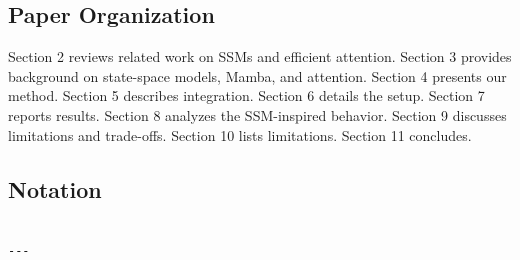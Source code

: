 \subsection{Paper Organization}

Section 2 reviews related work on SSMs and efficient attention. Section 3 
provides background on state-space models, Mamba, and attention. Section 4 
presents our method. Section 5 describes integration. Section 6 details the 
setup. Section 7 reports results. Section 8 analyzes the SSM-inspired 
behavior. Section 9 discusses limitations and trade-offs. Section 10 lists 
limitations. Section 11 concludes.



\subsection{Notation}

\begin{lstlisting}

---
\end{lstlisting}